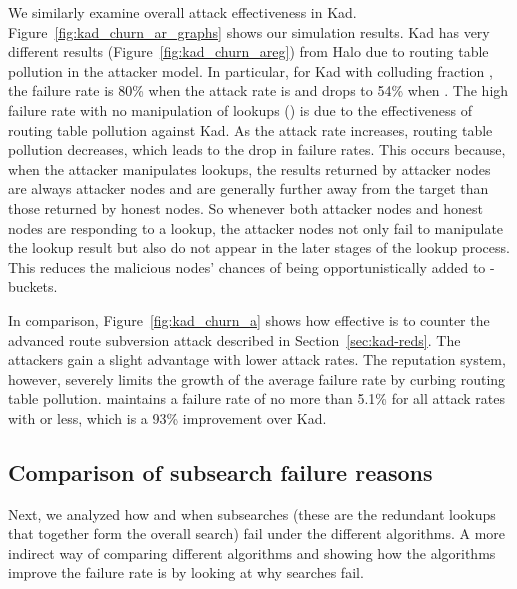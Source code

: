  We similarly examine overall attack effectiveness in
Kad. Figure~\ref{fig:kad_churn_ar_graphs} shows our simulation
results. Kad has very different results
(Figure~\ref{fig:kad_churn_areg}) from Halo due to routing table
pollution in the attacker model.
In particular, for Kad with colluding fraction , the failure
rate is 80\% when the attack rate is  and drops to 54\% when
. The high failure rate with no manipulation of lookups ()
is due to the effectiveness of routing table pollution against Kad. As
the attack rate increases, routing table pollution decreases, which
leads to the drop in failure rates.
This occurs because, when the attacker manipulates lookups, the results
returned by attacker nodes are always attacker nodes and are generally
further away from the target than those returned by honest nodes. So
whenever both attacker nodes and honest nodes are responding to a
lookup, the attacker nodes not only fail to manipulate the lookup result
but also do not appear in the later stages of the lookup process. This
reduces the malicious nodes' chances of being opportunistically added to
-buckets.

In comparison, Figure~\ref{fig:kad_churn_a} shows how effective \ksys is
to counter the advanced route subversion attack described in
Section~\ref{sec:kad-reds}. The attackers gain a slight advantage with
lower attack rates. The reputation system, however, severely limits the
growth of the average failure rate by curbing routing table
pollution. \ksys maintains a failure rate of no more than 5.1\% for all
attack rates with  or less, which is a 93\% improvement over
Kad.






\subsection{Comparison of subsearch failure reasons}

Next, we analyzed how and when subsearches (these are the redundant
lookups that together form the overall search) fail under the different
algorithms. A more indirect way of comparing different algorithms and
showing how the algorithms improve the failure rate is by looking at why
searches fail.

